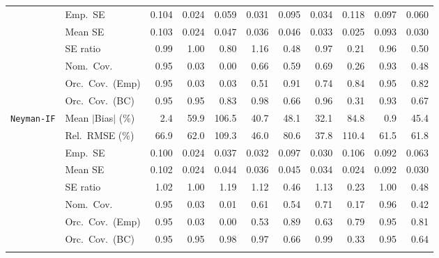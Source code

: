 \begin{landscape}
\begin{longtable}{llrrrrrrrrr}
 & Emp.\ SE & 0.104 & 0.024 & 0.059 & 0.031 & 0.095 & 0.034 & 0.118 & 0.097 & 0.060 \\
 & Mean SE & 0.103 & 0.024 & 0.047 & 0.036 & 0.046 & 0.033 & 0.025 & 0.093 & 0.030 \\
 & SE ratio & \cellcolor{ranktwo}0.99 & \cellcolor{rankone}1.00 & 0.80 & 1.16 & 0.48 & \cellcolor{rankthree}0.97 & 0.21 & 0.96 & 0.50 \\
 & Nom.\ Cov. & \cellcolor{rankone}0.95 & 0.03 & 0.00 & 0.66 & 0.59 & \cellcolor{rankthree}0.69 & 0.26 & \cellcolor{ranktwo}0.93 & 0.48 \\
 & Orc.\ Cov.\ (Emp) & \cellcolor{rankone}0.95 & 0.03 & 0.03 & 0.51 & \cellcolor{ranktwo}0.91 & 0.74 & \cellcolor{rankthree}0.84 & \cellcolor{rankone}0.95 & 0.82 \\
 & Orc.\ Cov.\ (BC) & \cellcolor{rankone}0.95 & \cellcolor{rankone}0.95 & 0.83 & 0.98 & 0.66 & \cellcolor{ranktwo}0.96 & 0.31 & \cellcolor{rankthree}0.93 & 0.67 \\
\addlinespace[2pt]
\quad \texttt{Neyman-IF} & Mean $|$Bias$|$ (\%) & \cellcolor{ranktwo}2.4 & 59.9 & 106.5 & 40.7 & 48.1 & \cellcolor{rankthree}32.1 & 84.8 & \cellcolor{rankone}0.9 & 45.4 \\
 & Rel.\ RMSE (\%) & 66.9 & 62.0 & 109.3 & \cellcolor{ranktwo}46.0 & 80.6 & \cellcolor{rankone}37.8 & 110.4 & \cellcolor{rankthree}61.5 & 61.8 \\
 & Emp.\ SE & 0.100 & 0.024 & 0.037 & 0.032 & 0.097 & 0.030 & 0.106 & 0.092 & 0.063 \\
 & Mean SE & 0.102 & 0.024 & 0.044 & 0.036 & 0.045 & 0.034 & 0.024 & 0.092 & 0.030 \\
 & SE ratio & \cellcolor{ranktwo}1.02 & \cellcolor{rankone}1.00 & 1.19 & \cellcolor{rankthree}1.12 & 0.46 & 1.13 & 0.23 & \cellcolor{rankone}1.00 & 0.48 \\
 & Nom.\ Cov. & \cellcolor{rankone}0.95 & 0.03 & 0.01 & 0.61 & 0.54 & \cellcolor{rankthree}0.71 & 0.17 & \cellcolor{ranktwo}0.96 & 0.42 \\
 & Orc.\ Cov.\ (Emp) & \cellcolor{rankone}0.95 & 0.03 & 0.00 & 0.53 & \cellcolor{ranktwo}0.89 & 0.63 & 0.79 & \cellcolor{rankone}0.95 & \cellcolor{rankthree}0.81 \\
 & Orc.\ Cov.\ (BC) & \cellcolor{rankone}0.95 & \cellcolor{rankone}0.95 & \cellcolor{rankthree}0.98 & \cellcolor{ranktwo}0.97 & 0.66 & 0.99 & 0.33 & \cellcolor{rankone}0.95 & 0.64 \\
\addlinespace[2pt]
\end{longtable}
\end{landscape}
